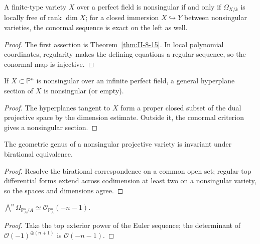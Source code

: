 \begin{theorem}
\label{thm:II-8-17}
A finite-type variety $X$ over a perfect field is nonsingular if and only if $\Omega_{X/k}$ is
locally free of rank $\dim X$; for a closed immersion $X\hookrightarrow Y$ between nonsingular
varieties, the conormal sequence is exact on the left as well.
\end{theorem}
\begin{proof}
The first assertion is Theorem~\ref{thm:II-8-15}. In local polynomial coordinates, regularity
makes the defining equations a regular sequence, so the conormal map is injective.
\end{proof}

\begin{theorem}
\label{thm:II-8-18}
If $X\subset\mathbb P^n$ is nonsingular over an infinite perfect field, a general hyperplane
section of $X$ is nonsingular (or empty).
\end{theorem}
\begin{proof}
The hyperplanes tangent to $X$ form a proper closed subset of the dual projective space by the
dimension estimate. Outside it, the conormal criterion gives a nonsingular section.
\end{proof}

\begin{theorem}
\label{thm:II-8-19}
The geometric genus of a nonsingular projective variety is invariant under birational equivalence.
\end{theorem}
\begin{proof}
Resolve the birational correspondence on a common open set; regular top differential forms extend
across codimension at least two on a nonsingular variety, so the spaces and dimensions agree.
\end{proof}

\begin{corollary}
\label{cor:II-8-20}
$\bigwedge^n\Omega_{\mathbb P^n_A/A}\simeq\mathcal O_{\mathbb P^n_A}(-n-1)$.
\end{corollary}
\begin{proof}
Take the top exterior power of the Euler sequence; the determinant of
$\mathcal O(-1)^{\oplus(n+1)}$ is $\mathcal O(-n-1)$.
\end{proof}

